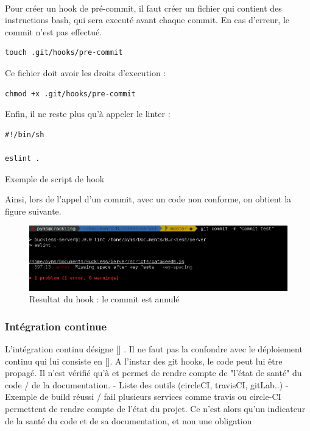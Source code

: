         \paragraph{}
            Pour créer un hook de pré-commit, il faut créer un fichier qui contient des instructions bash,
            qui sera executé avant chaque commit. En cas d'erreur, le commit n'est pas effectué.

            \begin{verbatim}
touch .git/hooks/pre-commit
            \end{verbatim}

            Ce fichier doit avoir les droits d'execution :

            \begin{verbatim}
chmod +x .git/hooks/pre-commit
            \end{verbatim}

            Enfin, il ne reste plus qu'à appeler le linter :

            \begin{listing}[ht]
                \begin{verbatim}
#!/bin/sh

eslint .
                \end{verbatim}
                \caption{Exemple de script de hook}
            \end{listing}

            Ainsi, lors de l'appel d'un commit, avec un code non conforme, on obtient la figure suivante.

            \begin{figure}[ht]
                \centering
                \includegraphics[width=\textwidth]{./assets/hook.png}
                \caption{Resultat du hook : le commit est annulé}
            \end{figure}

    \subsubsection{Intégration continue}
        L'intégration continu désigne [] .
        Il ne faut pas la confondre avec le déploiement continu qui lui consiste en [].
        A l'instar des git hooks, le code peut lui être propagé. Il n'est vérifié qu'à et permet de rendre
        compte de "l'état de santé" du code / de la documentation.
        - Liste des outils (circleCI, travisCI, gitLab..)
        - Exemple de build réussi / fail
        plusieurs services comme travis ou circle-CI permettent de rendre compte de l'état du projet.
        Ce n'est alors qu'un indicateur de la santé du code et de sa documentation, et non une obligation